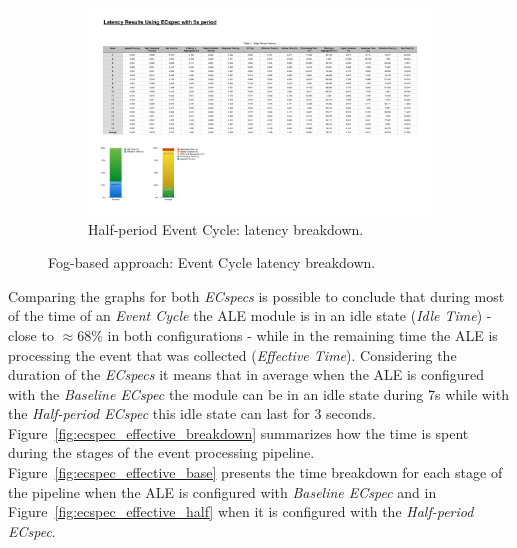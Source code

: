 \begin{figure}[ht!]
\begin{subfigure}{.5\textwidth}
   \includegraphics[height=\linewidth]{./images/edge_ecspecf_breakdown}
   \caption{Half-period Event Cycle: latency breakdown.}
   \label{fig:ecspec_half}
 \end{subfigure}
 \caption[Fog-based approach: event latency breakdown.]{Fog-based approach: Event Cycle latency breakdown.}
 \label{fig:ecspec_breakdown}
\end{figure}

Comparing the graphs for both \textit{ECspecs} is possible to conclude that during most of the time of
an \textit{Event Cycle} the \gls{ALE} module is in an idle state (\textit{Idle Time}) - close to $\approx68\%$
in both configurations - while in the remaining time the \gls{ALE} is processing the event that was
collected (\textit{Effective Time}). Considering the duration of the \textit{ECspecs} it means that in
average when the \gls{ALE} is configured with the \textit{Baseline ECspec} the module can be in an idle
state during 7s while with the \textit{Half-period ECspec} this idle state can last for 3 seconds.\\

Figure~\ref{fig:ecspec_effective_breakdown} summarizes how the time is spent during the stages of the
event processing pipeline. Figure~\ref{fig:ecspec_effective_base} presents the time breakdown for
each stage of the pipeline when the \gls{ALE} is configured with \textit{Baseline ECspec} and in
Figure~\ref{fig:ecspec_effective_half} when it is configured with the \textit{Half-period ECspec}.\\

